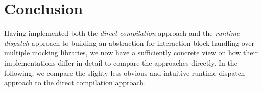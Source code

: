 \chapter{Conclusion}\label{chap:Conclusion}
Having implemented both
the \textit{direct compilation} approach and
the \textit{runtime dispatch} approach to
building an abstraction for interaction block handling
over multiple mocking libraries,
we now have a sufficiently concrete view on
how their implementations differ in detail
to compare the approaches directly.
In the following, we compare
the slighty less obvious and intuitive runtime dispatch approach
to the direct compilation approach.








